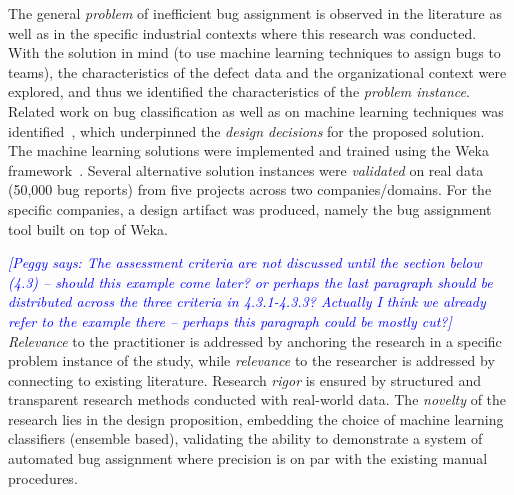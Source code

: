 \documentclass[graybox]{svmult}
\newcommand{\peggy}[1]{\textcolor{blue}{{\it [Peggy says: #1]}}}
\newcommand{\peggy}[1]{}
\begin{document}
The general \emph{problem} of inefficient bug assignment is observed in the literature as well as in the specific industrial contexts where this research was conducted. With the solution in mind (to use machine learning techniques to assign bugs to teams), the characteristics of the defect data and the organizational context were explored, and thus we identified the characteristics of the \emph{problem instance}. Related work on bug classification as well as on machine learning techniques was identified~\cite{Borg2013EMSE}, which underpinned the \emph{design decisions} for the proposed solution. The machine learning solutions were implemented and trained using the Weka framework~\cite{hall_weka_2009}. Several alternative solution instances were \emph{validated} on real data (50,000 bug reports) from five projects across two companies/domains. For the specific companies, a design artifact was produced, namely the bug assignment tool built on top of Weka.


\peggy{The assessment criteria are not discussed until the section below (4.3) -- should this example come later? or perhaps the last paragraph should be distributed across the three criteria in 4.3.1-4.3.3? Actually I think we already refer to the example there -- perhaps this paragraph could be mostly cut?} 
\emph{Relevance} to the practitioner is addressed by anchoring the research in a specific problem instance of the study, while \emph{relevance} to the researcher is addressed by connecting to existing literature. Research \emph{rigor} is ensured by structured and transparent research methods conducted with real-world data. The \emph{novelty} of the research lies in the design proposition, embedding the choice of machine learning classifiers (ensemble based), validating the ability to demonstrate a system of automated bug assignment where precision is on par with the existing manual procedures.
\end{document}
